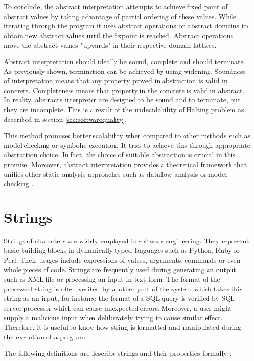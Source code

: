 \documentclass[12pt,final,oneside]{fithesis2}
\theoremstyle{definition}
\begin{document}
To conclude, the abstract interpretation attempts to achieve fixed point of
abstract values by taking advantage of partial ordering of these values.
While iterating through the program it uses abstract operations on abstract
domains to obtain new abstract values until the fixpoint is reached.
Abstract operations move the abstract values "upwards" in their respective
domain lattices.

Abstract interpretation should ideally be sound, complete and should
terminate \cite{}. As previously shown, termination can be achieved by using
widening. Soundness of interpretation means that any property proved in
abstraction is valid in concrete. Completeness means that property in the
concrete is valid in abstract. In reality, abstracts interpreter are designed
to be sound and to terminate, but they are incomplete. This is a result
of the undecidability of Halting problem as described in
section \ref{sec:softwarequality}. 

This method promises better scalability when compared to other
methods such as model checking or symbolic execution. It tries to achieve
this through appropriate abstraction choice. In fact, the choice of suitable
abstraction is crucial in this promise. Moreover, abstract interpretation
provides a theoretical framework that unifies other static analysis
approaches such as dataflow analysis \cite{CousotCousot77-1} or model
checking \cite{CousotCousot99-1}.


\section{Strings}
\label{sec:strings}

Strings of characters are widely employed in software engineering. They
represent basic building blocks in dynamically typed languages such as
Python, Ruby or Perl. Their usages include expressions of values,
arguments, commands or even whole pieces of code. Strings are frequently
used during generating an output such as XML file or processing an input
in text form. The format of the processed string is often verified by
another part of the system which takes this string as an input, for
instance the format of a SQL query is verified by SQL server processor
which can cause unexpected errors. Moreover, a user might supply a
malicious input when deliberately trying to cause similar effect.
Therefore, it is useful to know how string is formatted and manipulated
during the execution of a program.

The following definitions are describe strings and their properties
formally \cite{Kozen97-1}:
\end{document}
